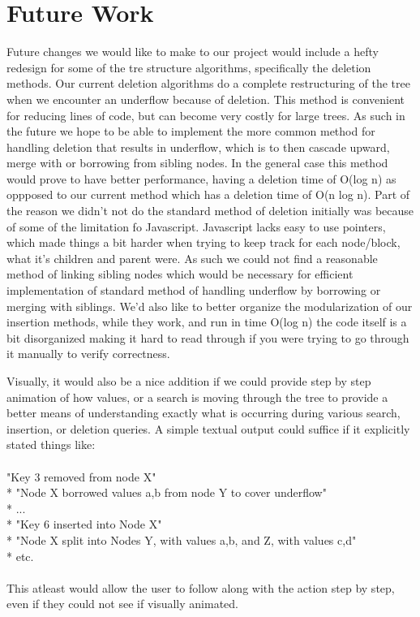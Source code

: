 \section{Future Work}

Future changes we would like to make to our project would include a
hefty redesign for some of the tre structure algorithms, specifically
the deletion methods.  Our current deletion algorithms do a complete
restructuring of the tree when we encounter an underflow because of
deletion.  This method is convenient for reducing lines of code, but
can become very costly for large trees.  As such in the future we hope
to be able to implement the more common method for handling deletion
that results in underflow, which is to then cascade upward, merge with
or borrowing from sibling nodes.  In the general case this method
would prove to have better performance, having a deletion time of
O(log n) as oppposed to our current method which has a deletion time
of O(n log n).  Part of the reason we didn't not do the standard
method of deletion initially was because of some of the limitation fo
Javascript.  Javascript lacks easy to use pointers, which made things
a bit harder when trying to keep track for each node/block, what it's
children and parent were.  As such we could not find a reasonable
method of linking sibling nodes which would be necessary for efficient
implementation of standard method of handling underflow by borrowing
or merging with siblings.  We'd also like to better organize the
modularization of our insertion methods, while they work, and run in
time O(log n) the code itself is a bit disorganized making it hard to
read through if you were trying to go through it manually to verify
correctness.

Visually, it would also be a nice addition if we could provide step by
step animation of how values, or a search is moving through the tree
to provide a better means of understanding exactly what is occurring
during various search, insertion, or deletion queries.  A simple
textual output could suffice if it explicitly stated things like:
\\ \\
"Key 3 removed from node X"
\\*
"Node X borrowed values a,b from node Y to cover underflow"
\\*
...
\\*
"Key 6 inserted into Node X"
\\*
"Node X split into Nodes Y, with values a,b, and Z, with values c,d"
\\*
etc.
\\ \\
This atleast would allow the user to follow along with the action step
by step, even if they could not see if visually animated.

